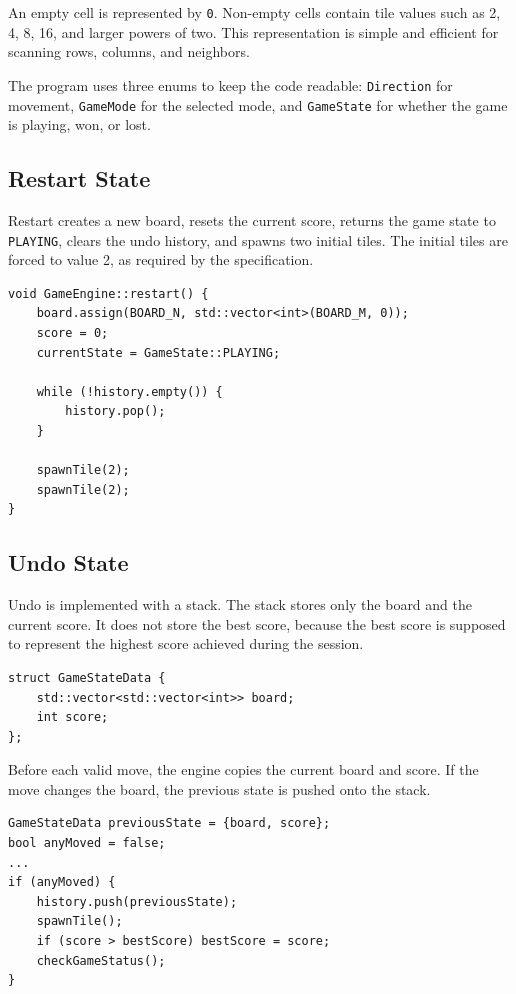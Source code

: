 \documentclass[a4paper,12pt]{article}
\begin{document}
An empty cell is represented by \texttt{0}. Non-empty cells contain tile values such as 2, 4, 8, 16, and larger powers of two. This representation is simple and efficient for scanning rows, columns, and neighbors.

The program uses three enums to keep the code readable: \texttt{Direction} for movement, \texttt{GameMode} for the selected mode, and \texttt{GameState} for whether the game is playing, won, or lost.

\subsection*{Restart State}

Restart creates a new board, resets the current score, returns the game state to \texttt{PLAYING}, clears the undo history, and spawns two initial tiles. The initial tiles are forced to value 2, as required by the specification.

\begin{lstlisting}[style=CppStyle,caption={Restart initializes a new game}]
void GameEngine::restart() {
    board.assign(BOARD_N, std::vector<int>(BOARD_M, 0));
    score = 0;
    currentState = GameState::PLAYING;

    while (!history.empty()) {
        history.pop();
    }

    spawnTile(2);
    spawnTile(2);
}
\end{lstlisting}

\subsection*{Undo State}

Undo is implemented with a stack. The stack stores only the board and the current score. It does not store the best score, because the best score is supposed to represent the highest score achieved during the session.

\begin{lstlisting}[style=CppStyle,caption={Undo state structure}]
struct GameStateData {
    std::vector<std::vector<int>> board;
    int score;
};
\end{lstlisting}

Before each valid move, the engine copies the current board and score. If the move changes the board, the previous state is pushed onto the stack.

\begin{lstlisting}[style=CppStyle,caption={Saving previous state before a valid move}]
GameStateData previousState = {board, score};
bool anyMoved = false;
...
if (anyMoved) {
    history.push(previousState);
    spawnTile();
    if (score > bestScore) bestScore = score;
    checkGameStatus();
}
\end{lstlisting}
\end{document}
